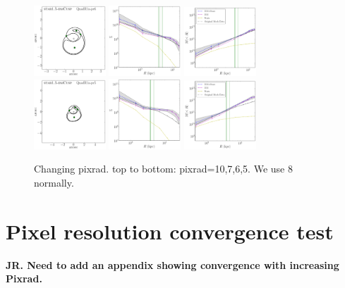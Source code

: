 \documentclass[galley,usenatbib]{mn2e}
\newcommand{\hilight}[1]{{\bf \color{red} #1}}
\begin{document}
\begin{figure}
\includegraphics[width=0.24\textwidth]{BCQuadR1a-pr6_TmS-a.pdf}
\includegraphics[width=0.24\textwidth]{BCQuadR1a-pr6_TmS-b.pdf}
\includegraphics[width=0.24\textwidth]{BCQuadR1a-pr6_TmS-c.pdf} \\
\includegraphics[width=0.24\textwidth]{BCQuadR1a-pr5_TmS-a.pdf}
\includegraphics[width=0.24\textwidth]{BCQuadR1a-pr5_TmS-b.pdf}
\includegraphics[width=0.24\textwidth]{BCQuadR1a-pr5_TmS-c.pdf} \\
\caption{Changing pixrad. top to bottom: pixrad=10,7,6,5. We use 8 normally.}
\label{}
\end{figure}

\section{Pixel resolution convergence test}
\hilight{JR. Need to add an appendix showing convergence with increasing Pixrad.} 



\end{document}
